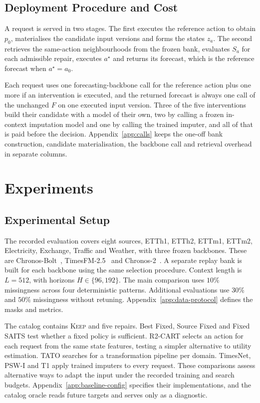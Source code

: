 \documentclass{article}
\begin{document}
\subsection{Deployment Procedure and Cost}
\label{sec:method-deploy}
A request is served in two stages. The first executes the reference action to obtain $p_0$,
materialises the candidate input versions and forms the states $z_a$. The second retrieves the
same-action neighbourhoods from the frozen bank, evaluates $S_a$ for each admissible repair,
executes $a^{\star}$ and returns its forecast, which is the reference forecast when
$a^{\star} = a_0$.

Each request uses one forecasting-backbone call for the reference action plus one more if an
intervention is executed, and the returned forecast is always one call of the unchanged $F$ on
one executed input version. Three of the five interventions build their candidate with a model
of their own, two by calling a frozen in-context imputation model and one by calling the
trained imputer, and all of that is paid before the decision.
Appendix~\ref{app:calls} keeps the one-off bank construction, candidate materialisation, the
backbone call and retrieval overhead in separate columns.

\section{Experiments}
\label{sec:exp}

\subsection{Experimental Setup}
\label{sec:exp-setup}
The recorded evaluation covers eight sources, ETTh1, ETTh2, ETTm1, ETTm2, Electricity,
Exchange, Traffic and Weather, with three frozen backbones. These are
Chronos-Bolt~\citep{chronosbolt2025}, TimesFM-2.5~\citep{das2024timesfm} and
Chronos-2~\citep{chronos2_2025}. A separate replay bank is built for each backbone using the
same selection procedure. Context length is $L=512$, with horizons $H \in \{96,192\}$.
The main comparison uses $10\%$ missingness across four deterministic patterns.
Additional evaluations use $30\%$ and $50\%$ missingness without retuning.
Appendix~\ref{app:data-protocol} defines the masks and metrics.

The catalog contains \textsc{Keep} and five repairs. Best Fixed, Source Fixed and Fixed SAITS
test whether a fixed policy is sufficient. R2-CART selects an action for each request from
the same state features, testing a simpler alternative to utility estimation. TATO searches
for a transformation pipeline per domain. TimesNet, PSW-I and T1 apply trained imputers to
every request. These comparisons assess alternative ways to adapt the input under the
recorded training and search budgets.
Appendix~\ref{app:baseline-config} specifies their implementations, and the catalog oracle
reads future targets and serves only as a diagnostic.
\end{document}
